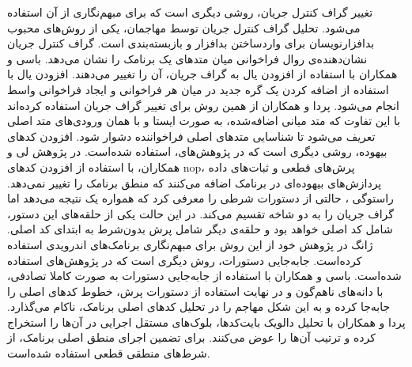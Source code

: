 تغییر گراف کنترل جریان، روشی دیگری است که برای مبهم‌نگاری از آن استفاده می‌شود. تحلیل گراف کنترل جریان توسط مهاجمان، یکی از روش‌های محبوب بدافزارنویسان برای واردساختن بدافزار و بازبسته‌بندی است. گراف کنترل جریان نشان‌دهنده‌ی روال فراخوانی میان متد‌های یک برنامک را نشان می‌دهد. باسی و همکاران با استفاده از افزودن یال به گراف جریان، آن را تغییر می‌دهند. افزودن یال با استفاده از اضافه کردن یک گره جدید در میان هر فراخوانی و ایجاد فراخوانی واسط انجام می‌شود. پردا و همکاران از همین روش برای تغییر گراف جریان استفاده کرده‌اند با این تفاوت که متد میانی اضافه‌شده، به صورت ایستا و با همان ورودی‌های متد اصلی تعریف می‌شود تا شناسایی متد‌های اصلی فراخواننده دشوار شود. افزودن کد‌های بیهوده، روشی دیگری است که در پژوهش‌های، استفاده شده‌است. در پژوهش لی و همکاران، با استفاده از افزودن کد‌های nop، پرش‌های قطعی‌ و ثبات‌های داده‌ پردازش‌های بیهوده‌‌ای در برنامک اضافه می‌کنند که منطق برنامک را تغییر نمی‌دهد. راستوگی ، حالتی از دستورات شرطی را معرفی کرد که همواره یک نتیجه می‌دهد اما گراف جریان را به دو شاخه تقسیم می‌کند. در این حالت یکی از حلقه‌های این دستور، شامل کد اصلی خواهد بود و حلقه‌ی دیگر شامل پرش بدون‌شرط به ابتدای کد اصلی. ژانگ  در پژوهش خود از این روش برای مبهم‌نگاری برنامک‌های اندرویدی استفاده  کرده‌است. جابه‌جایی دستورات، روش دیگری است که در پژوهش‌های  استفاده شده‌است. باسی و همکاران با استفاده از جابه‌جایی دستورات به صورت کاملا تصادفی، با دانه‌‌های ناهم‌گون و در نهایت استفاده از دستورات پرش، خطوط کد‌های اصلی را جابه‌جا کرده و به این شکل مهاجم را در تحلیل کد‌‌های اصلی برنامک، ناکام می‌گذارد. پردا و همکاران با تحلیل دالویک‌ بایت‌کد‌ها، بلوک‌های مستقل اجرایی در آن‌ها را استخراج کرده و ترتیب آن‌ها را عوض می‌کنند. برای تضمین اجرای منطق اصلی برنامک، از شرط‌های منطقی قطعی استفاده شده‌است.


